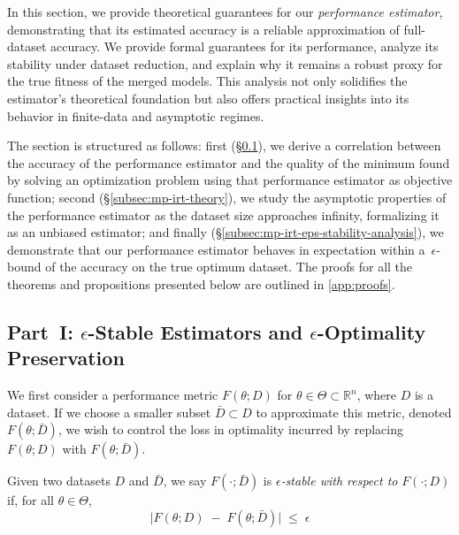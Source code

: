 \label{sec:theory}

In this section, we provide theoretical guarantees for our \textit{performance estimator}, demonstrating that its estimated accuracy is a reliable approximation of full-dataset accuracy. We provide formal guarantees for its performance, analyze its stability under dataset reduction, and explain why it remains a robust proxy for the true fitness of the merged models. 
This analysis not only solidifies the estimator's theoretical foundation but also offers practical insights into its behavior in finite-data and asymptotic regimes.

The section is structured as follows: first (\S \ref{subsec:eps-stability}), we derive a correlation between the accuracy of the performance estimator and the quality of the minimum found by solving an optimization problem using that performance estimator as objective function; second (\S \ref{subsec:mp-irt-theory}), we study the asymptotic properties of the performance estimator as the dataset size approaches infinity, formalizing it as an unbiased estimator; and finally (\S \ref{subsec:mp-irt-eps-stability-analysis}), we demonstrate that our performance estimator behaves in expectation within a \(\,\epsilon\)-bound of the accuracy on the true optimum dataset. The proofs for all the theorems and propositions presented below are outlined in \cref{app:proofs}.


\subsection{Part~I: \texorpdfstring{\(\epsilon\)}{ε}-Stable Estimators and 
\texorpdfstring{\(\epsilon\)}{ε}-Optimality Preservation}
\label{subsec:eps-stability}

We first consider a performance metric \(F(\theta;D)\) for 
\(\theta \in \Theta \subset \mathbb{R}^n\), where \(D\) is a dataset.  
If we choose a smaller subset \(\bar{D} \subset D\) to approximate this metric, 
denoted \(F(\theta;\bar{D})\), we wish to control the loss in optimality incurred 
by replacing \(F(\theta;D)\) with \(F(\theta;\bar{D})\).  

\begin{definition}
    Given two datasets \(D\) and \(\bar{D}\), we say \(F(\cdot;\bar{D})\) is 
    \emph{\(\epsilon\)-stable with respect to} \(F(\cdot;D)\) if, for all 
    \(\theta \in \Theta\),
    \[
      \bigl|F(\theta;D)\;-\;F(\theta;\bar{D})\bigr|\;\le\;\epsilon
    \]
\end{definition}


